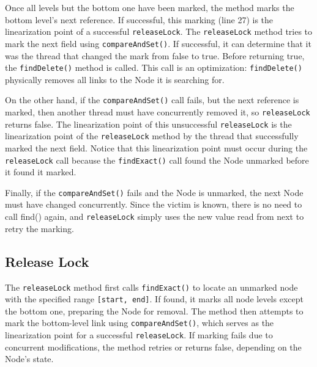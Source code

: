 Once all levels but the bottom one have been marked, the method marks the bottom level's next reference. If successful, this marking (line 27) is the linearization point of a successful \texttt{releaseLock}. The \texttt{releaseLock} method tries to mark the next field using \texttt{compareAndSet()}. If successful, it can determine that it was the thread that changed the mark from false to true. Before returning true, the \texttt{findDelete()} method is called. This call is an optimization: \texttt{findDelete()} physically removes all links to the Node it is searching for.

On the other hand, if the  \texttt{compareAndSet()} call fails, but the next reference is marked, then another thread must have concurrently removed it, so \texttt{releaseLock} returns false. The linearization point of this unsuccessful \texttt{releaseLock} is the linearization point of the \texttt{releaseLock} method by the thread that successfully marked the next field. Notice that this linearization point must occur during the \texttt{releaseLock} call because the \texttt{findExact()} call found the Node unmarked before it found it marked.

Finally, if the \texttt{compareAndSet()} fails and the Node is unmarked, the next Node must have changed concurrently. Since the victim is known, there is no need to call find() again, and \texttt{releaseLock} simply uses the new value read from next to retry the marking.

\clearpage

\subsection{Release Lock}\label{subsec:releaseLock}

The \texttt{releaseLock} method first calls \texttt{findExact()} to locate an unmarked node with the specified range \texttt{[start, end]}. If found, it marks all node levels except the bottom one, preparing the Node for removal. The method then attempts to mark the bottom-level link using \texttt{compareAndSet()}, which serves as the linearization point for a successful \texttt{releaseLock}. If marking fails due to concurrent modifications, the method retries or returns false, depending on the Node's state.

\vspace{15pt}

\begin{figure}[h]
    \centering
    
\end{figure}

